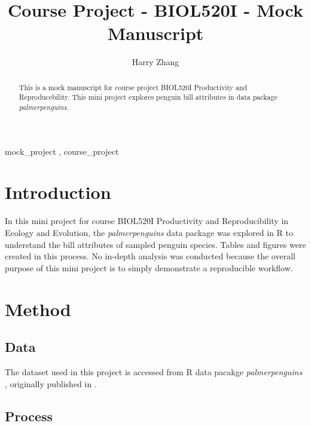 \documentclass[preprint, 3p,
authoryear]{elsarticle} %
\begin{document}
\begin{frontmatter}

  \title{Course Project - BIOL520I - Mock Manuscript}
    \author[UBC Okanagan]{Harry Zhang%
  }
  
  \begin{abstract}
  This is a mock manuscript for course project BIOL520I Productivity and
  Reproducebility. This mini project explores penguin bill attributes in
  data package \emph{palmerpenguins}.
  \end{abstract}
    \begin{keyword}
    mock\_project \sep 
    course\_project
  \end{keyword}
  
 \end{frontmatter}

\hypertarget{introduction}{%
\section{Introduction}\label{introduction}}

In this mini project for course BIOL520I Productivity and
Reproducibility in Ecology and Evolution, the \emph{palmerpenguins} data
package was explored in R to understand the bill attributes of sampled
penguin species. Tables and figures were created in this process. No
in-depth analysis was conducted because the overall purpose of this mini
project is to simply demonstrate a reproducible workflow.

\hypertarget{method}{%
\section{Method}\label{method}}

\hypertarget{data}{%
\subsection{Data}\label{data}}

The dataset used in this project is accessed from R data pacakge
\emph{palmerpenguins} \citep{Horst2020}, originally published in
\citet{Gorman2014}.

\hypertarget{process}{%
\subsection{Process}\label{process}}
\end{document}
